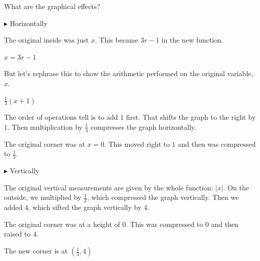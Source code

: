 \documentclass{ximera}
\begin{document}
\begin{example}
\begin{image}
\end{image}





What are the graphical effects?


$\blacktriangleright$ Horizontally

The original inside was just $x$.  This became $3r-1$ in the new function.   

$x = 3r - 1$

But let's rephrase this to show the arithmetic performed on the original variable, $x$.

$\frac{1}{3} (x + 1)$

The order of operations tell is to add $1$ first.  That shifts the graph to the right by $1$.  Then multiplication by $\frac{1}{3}$ compresses the graph horizontally.

The original corner was at $x=0$.  This moved right to $1$ and then was compressed to $\frac{1}{3}$.



$\blacktriangleright$ Vertically

The original vertical measurements are given by the whole function: $|x|$.  On the outside, we multiplied by $\frac{1}{2}$, which compressed the graph vertically.  Then we added $4$, which sifted the graph vertically by $4$.

The original corner was at a height of $0$.  This was compressed to $0$ and then raised to $4$.

The new corner is at $\left( \frac{1}{3}, 4 \right)$






\end{example}
\end{document}
